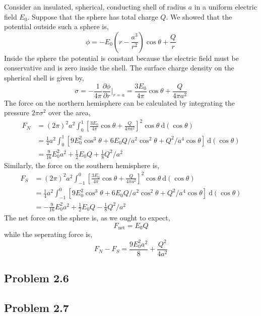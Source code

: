 \documentclass[12pt]{extarticle}
\renewcommand{\d}[1]{\: \mathrm{d}#1}
\newcommand{\pderiv}[2]{\frac{\partial{#1}}{\partial{#2}}}
\theoremstyle{definition}
\begin{document}
Consider an insulated, spherical, conducting shell of radius $a$ in a uniform electric field $E_0$. Suppose that the sphere has total charge $Q$. We showed that the potential outside such a sphere is, 
\[ \phi = - E_0 \left( r - \frac{a^3}{r^2} \right) \cos{\theta} + \frac{Q}{r} \]
Inside the sphere the potential is constant because the electric field must be conservative and is zero inside the shell. The surface charge density on the spherical shell is given by,
\[ \sigma = - \frac{1}{4 \pi} \pderiv{\phi}{r} \bigg|_{r = a} = \frac{3 E_0}{4 \pi} \cos{\theta} + \frac{Q}{4 \pi a^2} \]
The force on the northern hemisphere can be calculated by integrating the pressure $2 \pi \sigma^2$ over the area,
\begin{align*}
F_N & = (2 \pi)^2 a^2 \int_0^1 \left[ \frac{3 E_0}{4 \pi}  \cos{\theta} + \frac{Q}{4 \pi a^2} \right]^2 \cos{\theta} \d{(\cos{\theta})} 
\\
& = \tfrac{1}{4} a^2 \int_0^1 \left[ 9 E_0^2 \cos^3{\theta} + 6 E_0 Q/a^2 \cos^2{\theta} + Q^2 / a^4 \cos{\theta} \right] \d{(\cos{\theta})} 
\\
& = \tfrac{9}{16} E_0^2 a^2 + \tfrac{1}{2} E_0 Q + \tfrac{1}{8} Q^2 / a^2 
\end{align*}
Similarly, the force on the southern hemisphere is,
\begin{align*}
F_S & = (2 \pi)^2 a^2 \int_{-1}^0 \left[ \frac{3 E_0}{4 \pi}  \cos{\theta} + \frac{Q}{4 \pi a^2} \right]^2 \cos{\theta} \d{(\cos{\theta})} 
\\
& = \tfrac{1}{4} a^2 \int_{-1}^0 \left[ 9 E_0^2 \cos^3{\theta} + 6 E_0 Q/a^2 \cos^2{\theta} + Q^2 / a^4 \cos{\theta} \right] \d{(\cos{\theta})} 
\\
& = - \tfrac{9}{16} E_0^2 a^2 + \tfrac{1}{2} E_0 Q - \tfrac{1}{8} Q^2 / a^2
\end{align*}
The net force on the sphere is, as we ought to expect,
\[ F_{\text{net}} = E_0 Q \]
while the seperating force is,
\[ F_N - F_S = \frac{9 E_0^2 a^2}{8} + \frac{Q^2}{4 a^2} \]

\subsection{Problem 2.6}



\subsection{Problem 2.7}
\end{document}
